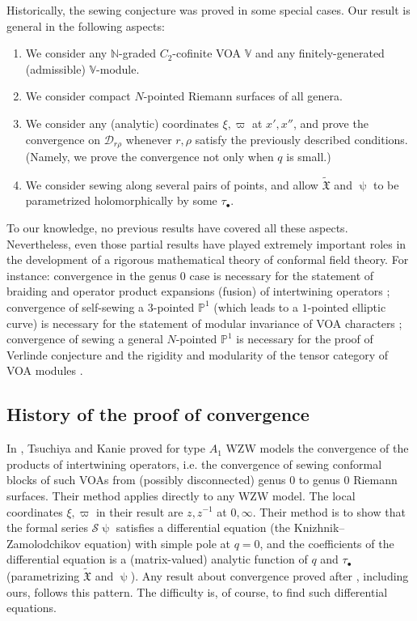 \documentclass[11pt,b5paper,notitlepage]{article}
\theoremstyle{definition}
\theoremstyle{plain}
\newcommand{\fk}{\mathfrak}
\newcommand{\mc}{\mathcal}
\newcommand{\wtd}{\widetilde}
\newcommand{\blt}{\bullet}
\newcommand{\Vbb}{\mathbb V}
\newcommand{\Nbb}{\mathbb N}
\newcommand{\Pbb}{\mathbb P}
\numberwithin{equation}{section}
\begin{document}
Historically, the sewing conjecture was proved in some special cases. Our result is general in the following aspects:
\begin{enumerate}[label=(\alph*)]
\item We consider any $\Nbb$-graded $C_2$-cofinite VOA $\Vbb$ and any finitely-generated (admissible) $\Vbb$-module.
\item We consider  compact $N$-pointed Riemann surfaces of all genera.
\item We consider any (analytic) coordinates $\xi,\varpi$ at $x',x''$, and prove the convergence on $\mc D_{r\rho}$ whenever $r,\rho$ satisfy the previously described conditions. (Namely, we  prove the convergence not only when $q$ is small.)
\item We consider sewing along several pairs of points, and allow $\wtd{\fk X}$ and $\uppsi$ to be parametrized holomorphically by some $\tau_\blt$. 
\end{enumerate}
To our knowledge, no previous results have covered all these aspects. Nevertheless, even those partial results have played extremely important roles in the development of a rigorous mathematical theory of conformal field theory. For instance: convergence in the genus $0$ case is necessary for the statement of braiding and operator product expansions (fusion) of intertwining operators \cite{TK88,Hua05a}; convergence of self-sewing a $3$-pointed $\Pbb^1$ (which leads to a $1$-pointed elliptic curve) is necessary for the statement of modular invariance of VOA characters \cite{Zhu96}; convergence of sewing a general $N$-pointed $\Pbb^1$ is necessary for the proof of Verlinde conjecture and the rigidity and modularity of the tensor category of VOA modules \cite{Hua05b,Hua08a,Hua08b}.




\subsection*{History of the proof of convergence}

In \cite{TK88}, Tsuchiya and Kanie proved for type $A_1$ WZW models the convergence of the  products of intertwining operators, i.e. the convergence of sewing conformal blocks of such VOAs from (possibly disconnected) genus $0$ to genus $0$ Riemann surfaces. Their method applies directly to any WZW model. The local coordinates $\xi,\varpi$ in their result are $z,z^{-1}$ at $0,\infty$.  Their method is to show that the formal series $\mc S\uppsi$ satisfies a differential equation (the Knizhnik–Zamolodchikov equation) with simple pole at $q=0$, and the coefficients of the differential equation is a (matrix-valued) analytic function of $q$ and $\tau_\blt$ (parametrizing $\wtd{\fk X}$ and $\uppsi$). Any result about convergence proved after \cite{TK88}, including ours, follows this pattern. The difficulty is, of course,  to find such differential equations. 
\end{document}
